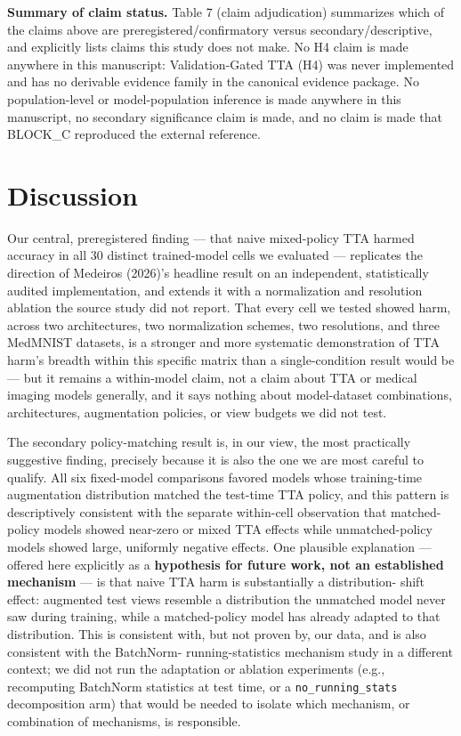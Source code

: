 \textbf{Summary of claim status.} Table 7 (claim adjudication) summarizes which of the claims above are preregistered/confirmatory versus secondary/descriptive, and explicitly lists claims this study does not make. No H4 claim is made anywhere in this manuscript: Validation-Gated TTA (H4) was never implemented and has no derivable evidence family in the canonical evidence package. No population-level or model-population inference is made anywhere in this manuscript, no secondary significance claim is made, and no claim is made that BLOCK\_C reproduced the external reference.

\section{Discussion}

Our central, preregistered finding --- that naive mixed-policy TTA harmed accuracy in all 30 distinct trained-model cells we evaluated --- replicates the direction of Medeiros (2026)'s headline result on an independent, statistically audited implementation, and extends it with a normalization and resolution ablation the source study did not report. That every cell we tested showed harm, across two architectures, two normalization schemes, two resolutions, and three MedMNIST datasets, is a stronger and more systematic demonstration of TTA harm's breadth within this specific matrix than a single-condition result would be --- but it remains a within-model claim, not a claim about TTA or medical imaging models generally, and it says nothing about model-dataset combinations, architectures, augmentation policies, or view budgets we did not test.

The secondary policy-matching result is, in our view, the most practically suggestive finding, precisely because it is also the one we are most careful to qualify. All six fixed-model comparisons favored models whose training-time augmentation distribution matched the test-time TTA policy, and this pattern is descriptively consistent with the separate within-cell observation that matched-policy models showed near-zero or mixed TTA effects while unmatched-policy models showed large, uniformly negative effects. One plausible explanation --- offered here explicitly as a \textbf{hypothesis for future work, not an established mechanism} --- is that naive TTA harm is substantially a distribution- shift effect: augmented test views resemble a distribution the unmatched model never saw during training, while a matched-policy model has already adapted to that distribution. This is consistent with, but not proven by, our data, and is also consistent with the BatchNorm- running-statistics mechanism \citet{schneider2020improving} study in a different context; we did not run the adaptation or ablation experiments (e.g., recomputing BatchNorm statistics at test time, or a \texttt{no\_\allowbreak running\_\allowbreak stats} decomposition arm) that would be needed to isolate which mechanism, or combination of mechanisms, is responsible.

